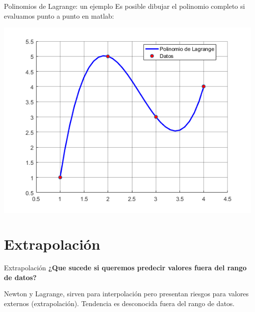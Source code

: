 \documentclass[xcolor=svgnames]{beamer} %
\theoremstyle{plain}
\renewcommand{\textbf}[1]{{\bfseries\textcolor{redUnq2}{#1}}}
\theoremstyle{definition}
\begin{document}
\begin{frame}{Polinomios de Lagrange: un ejemplo}
  Es posible dibujar el polinomio completo si evaluamos punto a punto en matlab:
  \begin{center}
  \begin{minipage}{.75\linewidth}
	  	\includegraphics[width=\linewidth]{EjemploLagrange/poly.png}  

  \end{minipage}
  \end{center}
\end{frame}


\section{Extrapolación}

\begin{frame}{Extrapolación}
  \textbf{¿Que sucede si queremos predecir valores fuera del rango de datos?}
  \pause
  
  Newton y Lagrange, sirven para interpolación pero presentan riesgos para valores externos (extrapolación). \vspace{20pt}
  \pause
  Tendencia es desconocida fuera del rango de datos.
\end{frame}
\end{document}
